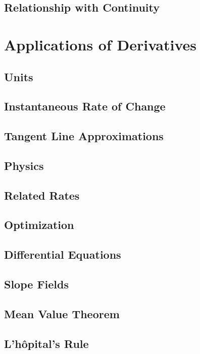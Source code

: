\documentclass{article}
\begin{document}
\subsection{Relationship with Continuity} 
\newpage
\section{Applications of Derivatives}
\subsection{Units}
\subsection{Instantaneous Rate of Change}
\subsection{Tangent Line Approximations}
\subsection{Physics}
\subsection{Related Rates}
\subsection{Optimization}
\subsection{Differential Equations}
\subsection{Slope Fields}\newpage
\subsection{Mean Value Theorem}
\subsection{L'h\^{o}pital's Rule}
\newpage
\end{document}
